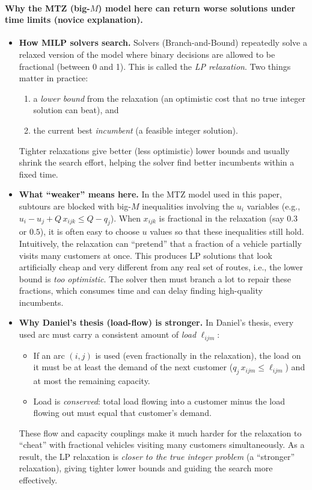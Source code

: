 \documentclass[a4paper,twoside]{article}
\begin{document}
\paragraph{Why the MTZ (big-$M$) model here can return worse solutions under time limits (novice explanation).}
\begin{itemize}
  \item \textbf{How MILP solvers search.} Solvers (Branch-and-Bound) repeatedly solve a relaxed version of the model where binary decisions are allowed to be fractional (between 0 and 1). This is called the \emph{LP relaxation}. Two things matter in practice:
  \begin{enumerate}
    \item a \emph{lower bound} from the relaxation (an optimistic cost that no true integer solution can beat), and
    \item the current best \emph{incumbent} (a feasible integer solution).
  \end{enumerate}
  Tighter relaxations give better (less optimistic) lower bounds and usually shrink the search effort, helping the solver find better incumbents within a fixed time.

  \item \textbf{What “weaker” means here.} In the MTZ model used in this paper, subtours are blocked with big-$M$ inequalities involving the $u_i$ variables (e.g., $u_i - u_j + Q\,x_{ijk} \le Q - q_j$). When $x_{ijk}$ is fractional in the relaxation (say $0.3$ or $0.5$), it is often easy to choose $u$ values so that these inequalities still hold. Intuitively, the relaxation can “pretend” that a fraction of a vehicle partially visits many customers at once. This produces LP solutions that look artificially cheap and very different from any real set of routes, i.e., the lower bound is \emph{too optimistic}. The solver then must branch a lot to repair these fractions, which consumes time and can delay finding high-quality incumbents.

  \item \textbf{Why Daniel’s thesis (load-flow) is stronger.} In Daniel’s thesis, every used arc must carry a consistent amount of \emph{load} $\ell_{ijm}$:
  \begin{itemize}
    \item If an arc $(i,j)$ is used (even fractionally in the relaxation), the load on it must be at least the demand of the next customer ($q_j\,x_{ijm} \le \ell_{ijm}$) and at most the remaining capacity.
    \item Load is \emph{conserved}: total load flowing into a customer minus the load flowing out must equal that customer’s demand.
  \end{itemize}
  These flow and capacity couplings make it much harder for the relaxation to “cheat” with fractional vehicles visiting many customers simultaneously. As a result, the LP relaxation is \emph{closer to the true integer problem} (a “stronger” relaxation), giving tighter lower bounds and guiding the search more effectively.


\end{itemize}
\end{document}
